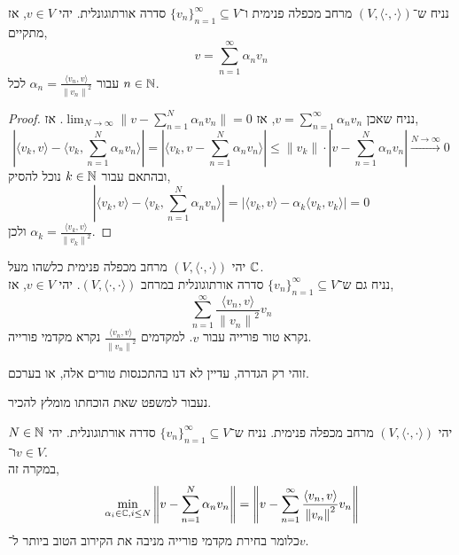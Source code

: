 \begin{theorem}
	נניח ש־$(V, \langle \cdot, \cdot \rangle)$ מרחב מכפלה פנימית ו־${\{ v_n \}}_{n = 1}^\infty \subseteq V$ סדרה אורתוגונלית.
	יהי $v \in V$, אז מתקיים,
	\[
		v = \sum_{n = 1}^\infty \alpha_n v_n
	\]
	עבור $\alpha_n = \frac{\langle v_n, v \rangle}{{\lVert v_n \rVert}^2}$ לכל $n \in \mathbb{N}$.
\end{theorem}
\begin{proof}
	נניח שאכן $v = \sum_{n = 1}^\infty \alpha_n v_n$, אז $\lim_{N \to \infty} \lVert v - \sum_{n = 1}^N \alpha_n v_n \rVert = 0$.
	אז,
	\[
		\left\lvert \langle v_k, v \rangle - \langle v_k, \sum_{n = 1}^N \alpha_n v_n \rangle \right\rvert
		= \left\lvert \langle v_k, v - \sum_{n = 1}^N \alpha_n v_n \rangle \right\rvert
		\le \lVert v_k \rVert \cdot \left\lvert v - \sum_{n = 1}^N \alpha_n v_n \right\rvert \xrightarrow{N \to \infty} 0
	\]
	ובהתאם עבור $k \in \mathbb{N}$ נוכל להסיק,
	\[
		\left\lvert \langle v_k, v \rangle - \langle v_k, \sum_{n = 1}^N \alpha_n v_n \rangle \right\rvert
		= | \langle v_k, v \rangle - \alpha_k \langle v_k, v_k \rangle|
		= 0
	\]
	ולכן $\alpha_k = \frac{\langle v_k, v \rangle}{{\lVert v_k \rVert}^2}$.
\end{proof}
\begin{definition}
	יהי $(V, \langle \cdot, \cdot \rangle)$ מרחב מכפלה פנימית כלשהו מעל $\mathbb{C}$. \\
	נניח גם ש־${\{ v_n \}}_{n = 1}^\infty \subseteq V$ סדרה אורתוגונלית במרחב $(V, \langle \cdot, \cdot \rangle)$.
	יהי $v \in V$, אז,
	\[
		\sum_{n = 1}^\infty \frac{\langle v_n, v \rangle}{{\lVert v_n \rVert}^2} v_n
	\]
	נקרא טור פורייה עבור $v$.
	למקדמים $\frac{\langle v_n, v \rangle}{{\lVert v_n \rVert}^2}$ נקרא מקדמי פורייה.
\end{definition}
\begin{remark}
	זוהי רק הגדרה, עדיין לא דנו בהתכנסות טורים אלה, או בערכם.
\end{remark}
נעבור למשפט שאת הוכחתו מומלץ להכיר.
\begin{theorem}
	יהי $(V, \langle \cdot, \cdot \rangle)$ מרחב מכפלה פנימית.
	נניח ש־${\{ v_n \}}_{n = 1}^\infty \subseteq V$ סדרה אורתוגונלית.
	יהי $N \in \mathbb{N}$ ו־$v \in V$. \\
	במקרה זה,
	\[
		\min_{\alpha_i \in \mathbb{C}, i \le N} \left\lVert v - \sum_{n = 1}^N \alpha_n v_n \right\rVert
		= \left\lVert v - \sum_{n = 1}^\infty \frac{\langle v_n, v \rangle}{{\lVert v_n \rVert}^2} v_n \right\rVert
	\]
	כלומר בחירת מקדמי פורייה מניבה את הקירוב הטוב ביותר ל־$v$.
\end{theorem}
